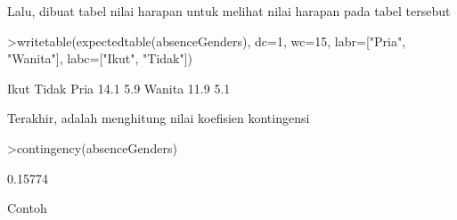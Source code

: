 \documentclass[a4paper,10pt]{article}
\begin{document}
\begin{eulernotebook}
\begin{eulercomment}
\begin{eulercomment}
\begin{eulercomment}
\begin{eulercomment}
\begin{eulercomment}
\begin{eulercomment}
\begin{eulercomment}
\begin{eulercomment}
\begin{eulercomment}
\begin{eulercomment}
\begin{eulercomment}
\begin{eulercomment}
\begin{eulercomment}
\begin{eulercomment}
\begin{eulercomment}
\begin{eulercomment}
\begin{eulercomment}
\begin{eulercomment}
\begin{eulercomment}
\begin{eulercomment}
\begin{eulercomment}
\begin{eulercomment}
\begin{eulercomment}
\begin{eulercomment}
\begin{eulercomment}
\begin{eulercomment}
\begin{eulercomment}
\begin{eulercomment}
\begin{eulercomment}
\begin{eulercomment}
\begin{eulercomment}
\begin{eulercomment}
\begin{eulercomment}
\begin{eulercomment}
\begin{eulercomment}
\begin{eulercomment}
\begin{eulercomment}
\begin{eulercomment}
\begin{eulercomment}
\begin{eulercomment}
\begin{eulercomment}
\begin{eulercomment}
\begin{eulercomment}
\begin{eulercomment}
\begin{eulercomment}
\begin{eulercomment}
\begin{eulercomment}
\begin{eulercomment}
\begin{eulercomment}
\begin{eulercomment}
\begin{eulercomment}
Lalu, dibuat tabel nilai harapan untuk melihat nilai harapan pada
tabel tersebut
\end{eulercomment}
\begin{eulerprompt}
>writetable(expectedtable(absenceGenders), dc=1, wc=15, labr=["Pria", "Wanita"], labc=["Ikut", "Tidak"])
\end{eulerprompt}
\begin{euleroutput}
                            Ikut          Tidak
             Pria           14.1            5.9
           Wanita           11.9            5.1
\end{euleroutput}
\begin{eulercomment}
Terakhir, adalah menghitung nilai koefisien kontingensi
\end{eulercomment}
\begin{eulerprompt}
>contingency(absenceGenders)
\end{eulerprompt}
\begin{euleroutput}
  0.15774
\end{euleroutput}
\begin{eulercomment}
Contoh


\end{eulercomment}
\end{eulercomment}
\end{eulercomment}
\end{eulercomment}
\end{eulercomment}
\end{eulercomment}
\end{eulercomment}
\end{eulercomment}
\end{eulercomment}
\end{eulercomment}
\end{eulercomment}
\end{eulercomment}
\end{eulercomment}
\end{eulercomment}
\end{eulercomment}
\end{eulercomment}
\end{eulercomment}
\end{eulercomment}
\end{eulercomment}
\end{eulercomment}
\end{eulercomment}
\end{eulercomment}
\end{eulercomment}
\end{eulercomment}
\end{eulercomment}
\end{eulercomment}
\end{eulercomment}
\end{eulercomment}
\end{eulercomment}
\end{eulercomment}
\end{eulercomment}
\end{eulercomment}
\end{eulercomment}
\end{eulercomment}
\end{eulercomment}
\end{eulercomment}
\end{eulercomment}
\end{eulercomment}
\end{eulercomment}
\end{eulercomment}
\end{eulercomment}
\end{eulercomment}
\end{eulercomment}
\end{eulercomment}
\end{eulercomment}
\end{eulercomment}
\end{eulercomment}
\end{eulercomment}
\end{eulercomment}
\end{eulercomment}
\end{eulercomment}
\end{eulernotebook}
\end{document}
